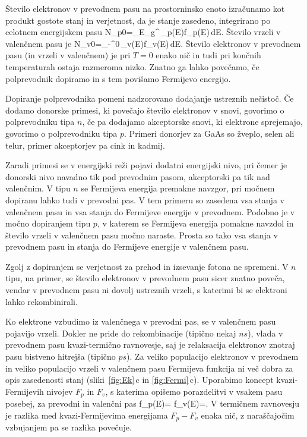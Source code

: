 Število elektronov v prevodnem pasu na prostorninsko enoto izračunamo kot 
produkt gostote stanj in verjetnost, da je stanje zasedeno, integrirano po 
celotnem energijskem pasu
\beq
N_{p0}=\int_{E_g}^{\infty}\,\rho_p(E)f_p(E)\,dE.
\label{6.3a}
\eeq
Število vrzeli v valenčnem pasu je 
\beq
N_{v0}=\int_{-\infty}^{0}\,\rho_v(E)f_v(E)\,dE.
\label{6.3b}
\eeq
Število elektronov v prevodnem pasu (in vrzeli v valenčnem) je pri
$T=0$ enako nič in tudi pri končnih temperaturah ostaja razmeroma nizko. 
Znatno ga lahko povečamo, če polprevodnik dopiramo in s tem povišamo 
Fermijevo energijo.

Dopiranje polprevodnika pomeni nadzorovano dodajanje ustreznih nečistoč. 
Če dodamo donorske primesi, ki povečajo število elektronov v snovi, 
govorimo o polprevodniku tipa $n$, če pa dodajamo akceptorske snovi, ki 
elektrone sprejemajo, govorimo o polprevodniku tipa $p$. 
Primeri donorjev za GaAs so žveplo, selen ali telur,
primer akceptorjev pa cink in kadmij. 

Zaradi primesi se v energijski 
reži pojavi dodatni energijski nivo, pri čemer je donorski nivo navadno 
tik pod prevodnim pasom, akceptorski pa tik nad valenčnim. V tipu $n$ se
Fermijeva energija premakne navzgor, pri močnem dopiranu lahko tudi v 
prevodni pas. V tem primeru so zasedena vsa stanja v valenčnem pasu in vsa
stanja do Fermijeve energije v prevodnem. Podobno je v močno dopiranjem tipu $p$, v katerem se Fermijeva 
energija pomakne navzdol in število vrzeli v valenčnem pasu močno naraste. 
Prosta so tako vsa stanja v prevodnem pasu in stanja do Fermijeve energije v 
valenčnem pasu.

\begin{remark}
 Zgolj z dopiranjem se verjetnost za prehod in izsevanje fotona ne spremeni. V
 $n$ tipu, na primer, se število elektronov v prevodnem pasu sicer znatno poveča, 
 vendar v prevodnem pasu  ni dovolj ustreznih vrzeli, s katerimi bi se elektroni lahko rekombinirali.
\end{remark}

Ko elektrone vzbudimo iz valenčnega v prevodni pas, se v valenčnem pasu pojavijo
vrzeli. Dokler ne pride do rekombinacije (tipično nekaj $\si{ns}$),
vlada v prevodnem pasu kvazi-termično ravnovesje, saj je relaksacija 
elektronov znotraj pasu bistveno hitrejša (tipično $\si{ps}$). 
Za veliko populacijo elektronov v prevodnem in veliko populacijo vrzeli v 
valenčnem pasu Fermijeva funkcija ni več dobra za opis zasedenosti stanj 
(sliki~\ref{fig:Ek}\,c in \ref{fig:Fermi}\,c). Uporabimo 
koncept kvazi-Fermijevih nivojev $F_p$ in $F_v$, s katerima opišemo porazdelitvi
v vsakem pasu posebej, za prevodni in valenčni pas
\beq
f_p(E)= \quad {} \quad 
f_v(E)=.
\eeq
V termičnem ravnovesju je razlika med kvazi-Fermijevima energijama $F_{p}-F_v$ 
enaka nič, z naraščajočim vzbujanjem pa se razlika povečuje.

